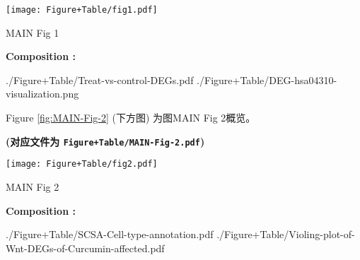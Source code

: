 \documentclass[
]{article}
\begin{document}
\def\@captype{figure}
\begin{center}
\texttt{[image: Figure+Table/fig1.pdf]}
\caption{MAIN Fig 1}\label{fig:MAIN-Fig-1}
\end{center}
\begin{center}\begin{tcolorbox}[colback=gray!10, colframe=gray!50, width=0.9\linewidth, arc=1mm, boxrule=0.5pt]
\textbf{
Composition
:}

\vspace{0.5em}

    ./Figure+Table/Treat-vs-control-DEGs.pdf \newline
./Figure+Table/DEG-hsa04310-visualization.png

\vspace{2em}
\end{tcolorbox}
\end{center}

\begin{center}\vspace{1.5cm}\end{center}

\begin{center}\vspace{1.5cm}\end{center}

Figure \ref{fig:MAIN-Fig-2} (下方图) 为图MAIN Fig 2概览。

\textbf{(对应文件为 \texttt{Figure+Table/MAIN-Fig-2.pdf})}

\def\@captype{figure}
\begin{center}
\texttt{[image: Figure+Table/fig2.pdf]}
\caption{MAIN Fig 2}\label{fig:MAIN-Fig-2}
\end{center}
\begin{center}\begin{tcolorbox}[colback=gray!10, colframe=gray!50, width=0.9\linewidth, arc=1mm, boxrule=0.5pt]
\textbf{
Composition
:}

\vspace{0.5em}

    ./Figure+Table/SCSA-Cell-type-annotation.pdf \newline
./Figure+Table/Violing-plot-of-Wnt-DEGs-of-Curcumin-affected.pdf

\vspace{2em}
\end{tcolorbox}
\end{center}
\end{document}
